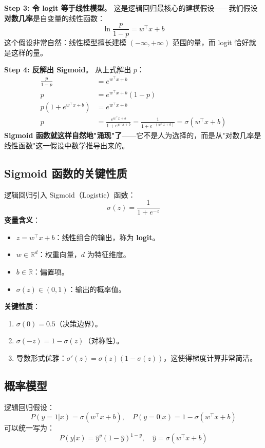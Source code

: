 \documentclass[12pt, a4paper]{article}
\begin{document}
\textbf{Step 3: 令 logit 等于线性模型}。
这是逻辑回归最核心的建模假设——我们假设\textbf{对数几率}是自变量的线性函数：
$$ \ln \frac{p}{1-p} = w^\top x + b $$
这个假设非常自然：线性模型擅长建模 $(-\infty, +\infty)$ 范围的量，而 logit 恰好就是这样的量。

\textbf{Step 4: 反解出 Sigmoid}。
从上式解出 $p$：
\begin{align}
\frac{p}{1-p} &= e^{w^\top x + b} \\
p &= e^{w^\top x + b} (1-p) \\
p (1 + e^{w^\top x + b}) &= e^{w^\top x + b} \\
p &= \frac{e^{w^\top x + b}}{1 + e^{w^\top x + b}} = \frac{1}{1 + e^{-(w^\top x + b)}} = \sigma(w^\top x + b)
\end{align}
\textbf{Sigmoid 函数就这样自然地"涌现"了}——它不是人为选择的，而是从"对数几率是线性函数"这一假设中数学推导出来的。

\subsection{Sigmoid 函数的关键性质}
逻辑回归引入 Sigmoid（Logistic）函数：
$$ \sigma(z) = \frac{1}{1 + e^{-z}} $$
\textbf{变量含义}：
\begin{itemize}
    \item $z = w^\top x + b$：线性组合的输出，称为 \textbf{logit}。
    \item $w \in \mathbb{R}^d$：权重向量，$d$ 为特征维度。
    \item $b \in \mathbb{R}$：偏置项。
    \item $\sigma(z) \in (0, 1)$：输出的概率值。
\end{itemize}
\textbf{关键性质}：
\begin{enumerate}
    \item $\sigma(0) = 0.5$（决策边界）。
    \item $\sigma(-z) = 1 - \sigma(z)$（对称性）。
    \item 导数形式优雅：$\sigma'(z) = \sigma(z)(1 - \sigma(z))$，这使得梯度计算非常简洁。
\end{enumerate}

\subsection{概率模型}
逻辑回归假设：
$$ P(y=1|x) = \sigma(w^\top x + b), \quad P(y=0|x) = 1 - \sigma(w^\top x + b) $$
可以统一写为：
$$ P(y|x) = \hat{y}^y (1 - \hat{y})^{1-y}, \quad \hat{y} = \sigma(w^\top x + b) $$
\end{document}
